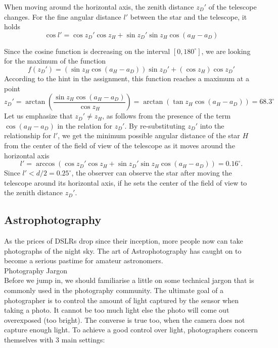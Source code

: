 \documentclass[a4paper,12pt]{extarticle}
\begin{document}
\begin{sol}
When moving around the horizontal axis, the zenith distance $z_D'$ of the telescope changes. For the fine angular distance $l'$ between the star and the telescope, it holds
$$\cos l' = \cos z_D' \cos z_H + \sin z_D' \sin z_H \cos(a_H - a_D)$$

Since the cosine function is decreasing on the interval $[0, 180^\circ]$, we are looking for the maximum of the function
$$f (z_D') = (\sin z_H \cos (a_H - a_D)) \sin z_D' +(\cos z_H) \cos z_D'$$ 
According to the hint in the assignment, this function reaches a maximum at a point
$$z_D'=\arctan\left(\frac{\sin z_H \cos(a_H-a_D)}{\cos z_H}\right)=\arctan (\tan z_H \cos (a_H-a_D))=68.3^\circ$$
Let us emphasize that $z_D'\neq z_H$, as follows from the presence of the term $\cos (a_H-a_D)$ in the relation for $z_D'$. By re-substituting $z_D'$ into the relationship for $l'$, we get the minimum possible angular distance of the star $H$ from the center of the field of view of the telescope as it moves around the horizontal axis
$$l' = \arccos (\cos z_D' \cos z_H + \sin z_D' \sin z_H \cos (a_H - a_D))= 0.16^\circ.$$
Since $l' < d/2 = 0.25^\circ$, the observer can observe the star after moving the telescope around its horizontal axis, if he sets the center of the field of view to the zenith distance $z_D'$.
\end{sol}


\clearpage
\subsection{Astrophotography}
As the prices of DSLRs drop since their inception, more people now can take photographs of the night
sky. The art of Astrophotography has caught on to become a serious pastime for amateur astronomers.\\

\textsf{Photography Jargon}\\

Before we jump in, we should familiarise a little on some technical jargon that is commonly used in the
photography community. The ultimate goal of a photographer is to control the amount of light captured by the sensor when taking a photo. It cannot be too much light else the photo will come out overexposed (too bright). The converse is true too, when the camera does not capture enough light.
To achieve a good control over light, photographers concern themselves with 3 main settings:
\end{document}
